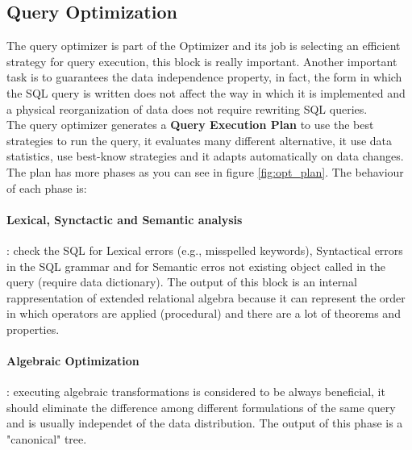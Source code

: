 \documentclass[12pt]{article}
\begin{document}
\subsection{Query Optimization}
The query optimizer is part of the Optimizer and its job is selecting an efficient strategy for query execution, this block is really important. Another important task is to guarantees the data independence property, in fact, the form in which the SQL query is written does not affect the way in which it is implemented and a physical reorganization of data does not require rewriting SQL queries.\\
The query optimizer generates a \textbf{Query Execution Plan} to use the best strategies to run the query, it evaluates many different alternative, it use data statistics, use best-know strategies and it adapts automatically on data changes. The plan has more phases as you can see in figure \ref{fig:opt_plan}. The behaviour of each phase is:
\paragraph{Lexical, Synctactic and Semantic analysis}: check the SQL for Lexical errors (e.g., misspelled keywords), Syntactical errors in the SQL grammar and for Semantic erros not existing object called in the query (require data dictionary). The output of this block is an internal rappresentation of extended relational algebra because it can represent the order in which operators are applied (procedural) and there are a lot of theorems and properties.\\
\paragraph{Algebraic Optimization}: executing algebraic transformations is considered to be always beneficial, it should eliminate the difference among different formulations of the same query and is usually independet of the data distribution. The output of this phase is a "canonical" tree.\\
\end{document}

